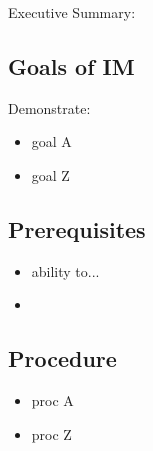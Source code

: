 
Executive Summary:

\subsection{Goals of IM}
Demonstrate:
\begin{itemize}
\item goal A
\item goal Z
\end{itemize}

\subsection{Prerequisites}
\begin{itemize}
\item ability to...
\item {}
\end{itemize}

\subsection{Procedure}
\begin{itemize}
\item proc A
\item proc Z
\end{itemize}
